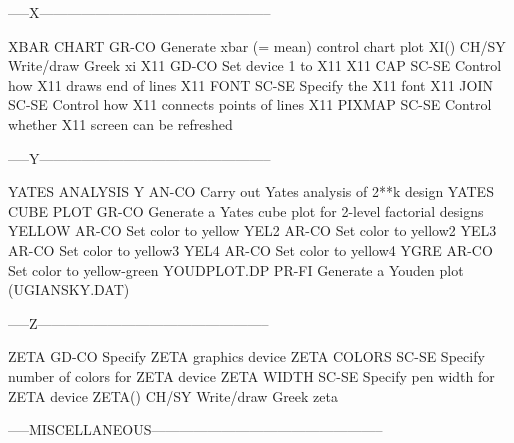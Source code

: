 -----X--------------------------------------------------

XBAR CHART                  GR-CO Generate xbar (= mean) control chart plot
XI()                        CH/SY Write/draw Greek xi
X11                         GD-CO Set device 1 to X11
X11 CAP                     SC-SE Control how X11 draws end of lines
X11 FONT                    SC-SE Specify the X11 font
X11 JOIN                    SC-SE Control how X11 connects points of lines
X11 PIXMAP                  SC-SE Control whether X11 screen can be refreshed

-----Y--------------------------------------------------

YATES ANALYSIS Y            AN-CO Carry out Yates analysis of 2**k design
YATES CUBE PLOT             GR-CO Generate a Yates cube plot for 2-level factorial designs
YELLOW                      AR-CO Set color to yellow
YEL2                        AR-CO Set color to yellow2
YEL3                        AR-CO Set color to yellow3
YEL4                        AR-CO Set color to yellow4
YGRE                        AR-CO Set color to yellow-green
YOUDPLOT.DP                 PR-FI Generate a Youden plot (UGIANSKY.DAT)

-----Z--------------------------------------------------

ZETA                        GD-CO Specify ZETA graphics device
ZETA COLORS                 SC-SE Specify number of colors for ZETA device
ZETA WIDTH                  SC-SE Specify pen width for ZETA device
ZETA()                      CH/SY Write/draw Greek zeta

-----MISCELLANEOUS--------------------------------------------------

